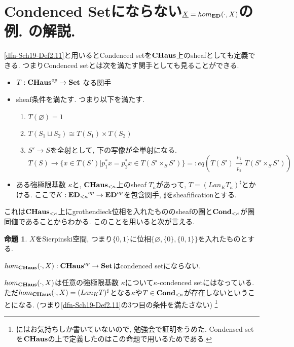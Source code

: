 \documentclass[dvipdfmx,a4paper,11pt]{report}
\theoremstyle{definition}
\newtheorem{prop}[thm]{命題}
\begin{document}
\section{Condenced Setにならない$\underline{X} = hom_{{\bf ED}}(\cdot, X)$の例. \cite[Warning 2.14]{Sch19}の解説.}
\ref{dfn-Sch19-Def2.11}と用いるとCondenced setを${\bf CHaus}$上のsheafとしても定義できる. 
つまりCondenced setとは次を満たす関手としても見ることができる. 
\begin{itemize}
\item $T : {\bf CHaus}^{op} \to {\bf Set}$ なる関手
\item sheaf条件を満たす. 
つまり以下を満たす.
\begin{enumerate}
\item $T(\varnothing)=1$ 
\item $T(S_1\sqcup S_2) \cong T(S_1) \times T(S_2)$
\item $S' \to S$を全射として, 下の写像が全単射になる.
$$T(S) \to \{ x \in T(S') | p_{1}^{*}x = p_{2}^{*}x \in T(S' \times_S S')\}
=:eq(T(S') \underset{p_2}{\overset{p_1}{\to}}T(S' \times_S S'))
$$
\end{enumerate}
\item ある強極限基数 $\kappa$と, ${\bf CHaus}_{< \kappa}$上のsheaf $T_{\kappa}$があって, $T = (Lan_{K}T_{\kappa})^{\sharp}$とかける. ここで$K : {{\bf ED}_{<\kappa}}^{op} \to {\bf ED}^{op}$を包含関手, $\sharp$をsheafificationとする. 
\end{itemize}

これは${ \bf CHaus}_{< \kappa}$上にgrothendieck位相を入れたもののsheafの圏と${\bf  Cond}_{< \kappa}$が圏同値であることからわかる. 
このことを用いると次が言える. 

\begin{tcolorbox}
 [colback = white, colframe = green!35!black, fonttitle = \bfseries,breakable = true]
\begin{prop}\cite[Warning 2.14]{Sch19}
$X$をSierpinski空間, つまり$\{0,1\}$に位相$\{\varnothing, \{0\}, \{0,1\} \}$を入れたものとする.

$hom_{{\bf CHaus}}(\cdot,  X) :{\bf CHaus}^{op} \to{\bf Set} $はcondenced setにならない.
\end{prop}
 \end{tcolorbox}
 
 $hom_{{\bf CHaus}}(\cdot,  X)$は任意の強極限基数
 $\kappa$について$\kappa$-condenced setにはなっている. 
 ただ$hom_{{\bf CHaus}}(\cdot,  X) =  (Lan_{K}T)^{\sharp}$となる$\kappa$や$T \in {\bf Cond}_{< \kappa}$が存在しないということになる. (つまり\ref{dfn-Sch19-Def2.11}の3つ目の条件を満たさない)
 \footnote{\cite[Warning 2.14]{Sch19}にはお気持ちしか書いていないので, 勉強会で証明をうめた. Condensed setを${\bf CHaus}$の上で定義したのはこの命題で用いるためである.}
 
\end{document}
